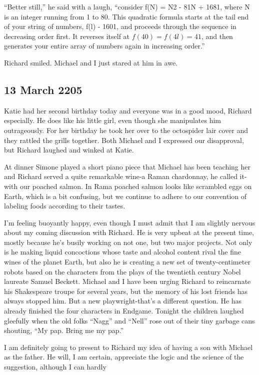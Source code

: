 \documentclass[]{article}
\begin{document}
“Better still,” he said with a laugh, “consider f(N) = N2 - 81N + 1681, where N is an integer running from 1 to 80.  This quadratic formula starts at the tail end of your string of numbers, f(l) - 1601, and proceeds through the sequence in decreasing order first.  It reverses itself at $f(40) = f(4l) = 41$, and then generates your entire array of numbers again in increasing order.”

Richard smiled.  Michael and I just stared at him in awe.

\subsection*{13 March 2205}

Katie had her second birthday today and everyone was in a good mood, Richard especially.  He does like his little girl, even though she manipulates him outrageously.  For her birthday he took her over to the octospider lair cover and they rattled the grills together.  Both Michael and I expressed our disapproval, but Richard laughed and winked at Katie.

At dinner Simone played a short piano piece that Michael has been teaching her and Richard served a quite remarkable wine-a Raman chardonnay, he called it-with our poached salmon.  In Rama poached salmon looks like scrambled eggs on Earth, which is a bit confusing, but we continue to adhere to our convention of labeling foods according to their tastes.

I’m feeling buoyantly happy, even though I must admit that I am slightly nervous about my coming discussion with Richard.  He is very upbeat at the present time, mostly because he’s busily working on not one, but two major projects.  Not only is he making liquid concoctions whose taste and alcohol content rival the fine wines of the planet Earth, but also he is creating a new set of twenty-centimeter robots based on the characters from the plays of the twentieth century Nobel laureate Samuel Beckett.  Michael and I have been urging Richard to reincarnate his Shakespeare troupe for several years, but the memory of his lost friends has always stopped him.  But a new playwright-that’s a different question.  He has already finished the four characters in Endgame.  Tonight the children laughed gleefully when the old folks “Nagg” and “Nell” rose out of their tiny garbage cans shouting, “My pap.  Bring me my pap.”

I am definitely going to present to Richard my idea of having a son with Michael as the father.  He will, I am certain, appreciate the logic and the science of the suggestion, although I can hardly
\end{document}
